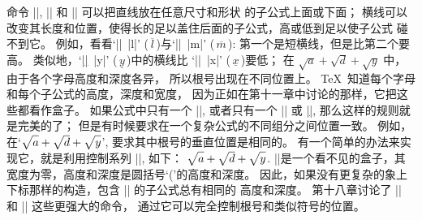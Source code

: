 \danger \1命令 |\sqrt|, |\underline| 和 |\overline| 可以把直线放在任意尺寸和形状%
的子公式上面或下面；
横线可以改变其长度和位置，使得长的足以盖住后面的子公式，高或低到足以使子公式%
碰不到它。%
例如，看看`|\overline|~|l|' ($\,\overline l\,$)与`|\overline|~|m|'
($\,\overline m\,$):
第一个是短横线，但是比第二个要高。%
类似地，`|\underline|~|y|' ($\,\underline y\,$)中的横线比%
`|\underline|~|x|' ($\,\underline x\,$)要低；
在 $\sqrt a + \sqrt d + \sqrt y$ 中，由于各个字母高度和深度各异，
所以根号出现在不同位置上。%
 \TeX\ 知道每个字母和每个子公式的高度，深度和宽度，
因为正如在第十一章中讨论的那样，它把这些都看作盒子。%
如果公式中只有一个 |\sqrt|, 或者只有一个 |\overline| 或 |\underline|,
那么这样的规则就是完美的了；
但是有时候要求在一个复杂公式的不同组分之间位置一致。%
例如，在`$\sqrt{\mathstrut a}+\sqrt{\mathstrut d}+\sqrt{\mathstrut y}$',
要求其中根号的垂直位置是相同的。%
有一个简单的办法来实现它，就是利用控制系列 |\mathstrut|, 如下：
\begintt
$\sqrt{\mathstrut a}+\sqrt{\mathstrut d}+\sqrt{\mathstrut y}$.
\endtt
|\mathstrut|是一个看不见的盒子，其宽度为零，高度和深度是圆括号`('的高度和深度。%
因此，如果没有更复杂的象上下标那样的构造，包含 |\mathstrut| 的子公式总有相同的%
高度和深度。%
第十八章讨论了 |\smash| 和 |\phantom| 这些更强大的命令，
通过它可以完全控制根号和类似符号的位置。

